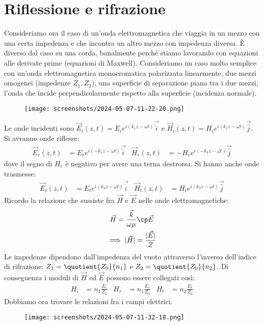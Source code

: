 \section{Riflessione e rifrazione}
Consideriamo ora il caso di un'onda elettromagnetica che viaggia in un mezzo con una certa impedenza e che incontra un altro mezzo con impedenza diversa. È diverso dal caso su una corda, banalmente perché stiamo lavorando con equazioni alle derivate prime (equazioni di Maxwell). Consideriamo un caso molto semplice con un'onda elettromagnetica monocromatica polarizzata linearmente, due mezzi omogenei (impedenze \(Z_1, Z_2\)), una superficie di separazione piana tra i due mezzi, l'onda che incide perpendicolarmente rispetto alla superficie (incidenza normale).
\begin{figure}[H]
	\centering
	\texttt{[image: screenshots/2024-05-07-11-22-20.png]}
\end{figure}
Le onde incidenti sono \(\vec{E}_i(z,t)=E_i e^{i(k_1 z- \omega t)}\vec{\hat{i}}\) e \(\vec{H}_i(z,t)=H_i e^{i(k_1 z -\omega t)}\vec{\hat{j}}\). Si avranno onde riflesse:
\begin{align}
	\vec{E}_r(z,t) &= E_r e^{i(-k_1 z - \omega t)} \vec{\hat{i}} &
	\vec{H}_r(z,t) &= - H_r e^{i(-k_1 z - \omega t)} \vec{\hat{j}}
\end{align}
dove il segno di \(H_r\) è negativo per avere una terna destrorsa. Si hanno anche onde trasmesse:
\begin{align}
	\vec{E}_t(z,t)&=E_t e^{i(k_2 z -\omega t)} \vec{\hat{i}} &
	\vec{H}_t (z,t)&=H_t e^{i(k_2 z- \omega t)} \vec{\hat{j}}
\end{align}
Ricordo la relazione che sussiste fra \(\vec{H}\) e \(\vec{E}\) nelle onde elettromagnetiche:
\begin{gather}
	\vec{H} = \frac{\vec{k}}{\omega \mu } \cp \vec{E}\\
	\implies \vert \vec{H} \vert = \frac{\vert \vec{E} \vert }{Z}
\end{gather}
Le impedenze dipendono dall'impedenza del vuoto attraverso l'inverso dell'indice di rifrazione: \(Z_1 = \quotient{Z_0}{n_1}\) e \(Z_2 = \quotient{Z_0}{n_2} \).
Di conseguenza i moduli di \(\vec{H}\) ed \(\vec{E}\) possono essere collegati così:
\begin{align}
	H_i &= n_1 \frac{E_i}{Z_0} &
	H_r &= n_1 \frac{E_r}{Z_0} &
	H_t &= n_2 \frac{E_t}{Z_0}
\end{align}
Dobbiamo ora trovare le relazioni fra i campi elettrici.
\begin{figure}[H]
	\centering
	\texttt{[image: screenshots/2024-05-07-11-32-18.png]}
\end{figure}
